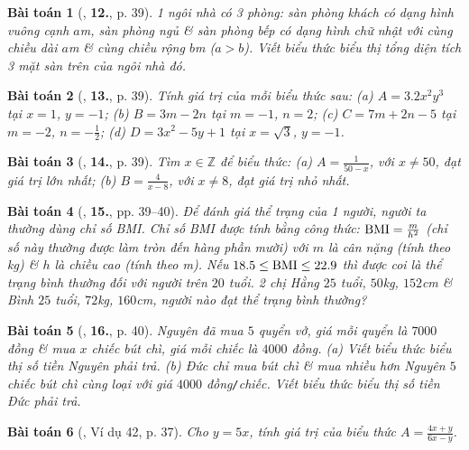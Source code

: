\documentclass{article}
\numberwithin{equation}{section}
\newtheorem{baitoan}{Bài toán}
\begin{document}
\begin{baitoan}[\cite{SBT_Toan_7_Canh_Dieu_tap_2}, \textbf{12.}, p. 39]
	1 ngôi nhà có 3 phòng: sàn phòng khách có dạng hình vuông cạnh $a$\emph{m}, sàn phòng ngủ \& sàn phòng bếp có dạng hình chữ nhật với cùng chiều dài $a$\emph{m} \& cùng chiều rộng $b$\emph{m} ($a > b$). Viết biểu thức biểu thị tổng diện tích 3 mặt sàn trên của ngôi nhà đó.
\end{baitoan}

\begin{baitoan}[\cite{SBT_Toan_7_Canh_Dieu_tap_2}, \textbf{13.}, p. 39]
	Tính giá trị của mỗi biểu thức sau: (a) $A = 3.2x^2y^3$ tại $x = 1$, $y = -1$; (b) $B = 3m - 2n$ tại $m = -1$, $n = 2$; (c) $C = 7m + 2n - 5$ tại $m = -2$, $n = -\frac{1}{2}$; (d) $D = 3x^2 - 5y + 1$ tại $x = \sqrt{3}$, $y = -1$.
\end{baitoan}

\begin{baitoan}[\cite{SBT_Toan_7_Canh_Dieu_tap_2}, \textbf{14.}, p. 39]
	Tìm $x\in\mathbb{Z}$ để biểu thức: (a) $A = \frac{1}{50 - x}$, với $x\ne50$, đạt giá trị lớn nhất; (b) $B = \frac{4}{x - 8}$, với $x\ne8$, đạt giá trị nhỏ nhất.
\end{baitoan}

\begin{baitoan}[\cite{SBT_Toan_7_Canh_Dieu_tap_2}, \textbf{15.}, pp. 39--40]
	Để đánh giá thể trạng của 1 người, người ta thường dùng chỉ số BMI. Chỉ số BMI được tính bằng công thức: ${\rm BMI} = \frac{m}{h^2}$ (chỉ số này thường được làm tròn đến hàng phần mười) với $m$ là cân nặng (tính theo \emph{kg}) \& $h$ là chiều cao (tính theo \emph{m}). Nếu $18.5\le{\rm BMI}\le22.9$ thì được coi là thể trạng bình thường đối với người trên $20$ tuổi. 2 chị Hằng $25$ tuổi, $50$\emph{kg}, $152$\emph{cm} \& Bình $25$ tuổi, $72$\emph{kg}, $160$\emph{cm}, người nào đạt thể trạng bình thường?
\end{baitoan}

\begin{baitoan}[\cite{SBT_Toan_7_Canh_Dieu_tap_2}, \textbf{16.}, p. 40]
	Nguyên đã mua $5$ quyển vở, giá mỗi quyển là $7000$ đồng \& mua $x$ chiếc bút chì, giá mỗi chiếc là $4000$ đồng. (a) Viết biểu thức biểu thị số tiền Nguyên phải trả. (b) Đức chỉ mua bút chì \& mua nhiều hơn Nguyên $5$ chiếc bút chì cùng loại với giá $4000$ \emph{đồng\texttt{/}chiếc}. Viết biểu thức biểu thị số tiền Đức phải trả.
\end{baitoan}

\begin{baitoan}[\cite{Tuyen_Toan_7}, Ví dụ 42, p. 37]
	Cho $y = 5x$, tính giá trị của biểu thức $A = \frac{4x + y}{6x - y}$.
\end{baitoan}
\end{document}

